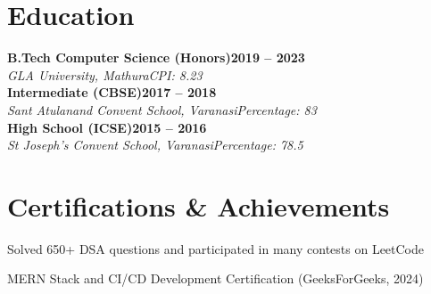 \documentclass[letterpaper,10pt]{article}
\newcommand{\heading}[2]{
  \hspace{6pt}#1\hfill#2\\[0.8pt]
}
\newcommand{\headingBf}[2]{
  \heading{\textbf{#1}}{\textbf{#2}}
}
\newcommand{\headingIt}[2]{
  \heading{\textit{#1}}{\textit{#2}}
}
\newenvironment{resume_list}{
  \vspace{-5pt}
  \begin{itemize}[itemsep=-3pt, parsep=0.2pt, leftmargin=20pt]
}{
  \end{itemize}
  \vspace{-4pt}
}
\begin{document}
\section{Education}
\vspace{-1pt}
\headingBf{B.Tech Computer Science (Honors)}{2019 -- 2023}
\headingIt{GLA University, Mathura}{CPI: 8.23}
\headingBf{Intermediate (CBSE)}{2017 -- 2018}
\headingIt{Sant Atulanand Convent School, Varanasi}{Percentage: 83}
\headingBf{High School (ICSE)}{2015 -- 2016}
\headingIt{St Joseph's Convent School, Varanasi}{Percentage: 78.5}

\section{Certifications \& Achievements}
\begin{resume_list}
  \item Solved 650+ DSA questions and participated in many contests on LeetCode \href{https://leetcode.com/u/KeshariPiyush24/}{\faLink}
  \vspace{1pt}
  \item MERN Stack and CI/CD Development Certification (GeeksForGeeks, 2024) \href{https://media.geeksforgeeks.org/certificates/1706532819/013b39c1dda8d49bf888496b0d0d6b1b.pdf}{\faLink}
\end{resume_list}
\end{document}
